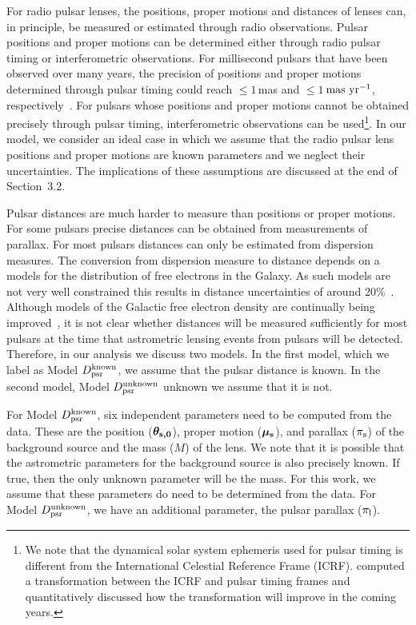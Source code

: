 \documentclass[iop,apj]{emulateapj}
\begin{document}
For radio pulsar lenses, the positions, proper motions and distances of lenses can, in 
principle, be measured or estimated through radio observations. Pulsar positions and proper 
motions can be determined either through radio pulsar timing or interferometric observations. 
%
For millisecond pulsars that have been observed over many years, the precision of positions 
and proper motions determined through pulsar timing could reach $\leq 1$\,mas and 
$\leq 1$\,$\rm{mas\ yr^{-1}}$, respectively~\citep[e.g.,][]{verbiest}.
%
For pulsars whose positions and proper motions cannot be obtained precisely through 
pulsar timing, interferometric observations can be used\footnote{We note that the dynamical 
solar system ephemeris used for pulsar timing is different from the International Celestial 
Reference Frame (ICRF). \citet{Madison13} computed a transformation between the ICRF 
and pulsar timing frames and quantitatively discussed how the transformation will improve in 
the coming years.}. In our model, we consider an ideal case in which we assume that the 
radio pulsar lens positions and proper motions are known parameters and we neglect their 
uncertainties. The implications of these assumptions are discussed at the end of Section~3.2.
%

Pulsar distances are much harder to measure than positions or proper motions.
For some pulsars precise distances can be obtained from measurements of parallax.
For most pulsars distances can only be estimated from dispersion measures. The conversion 
from dispersion measure to distance depends on a models for the distribution of 
free electrons in the Galaxy.
%
As such models are not very well constrained this results in distance uncertainties of
around 20\%~\citep{Taylor}.
%
Although models of the Galactic free electron density are continually being improved~\citep[e.g.,][]{cordes},
it is not clear whether distances will be measured sufficiently for most pulsars at 
the time that astrometric lensing events from pulsars will be detected.
Therefore, in our analysis we discuss two models. In the first model, which we 
label as Model $D_{\rm{psr}}^{\rm{known}}$, we assume that the pulsar distance is known. 
In the second model, Model $D_{\rm{psr}}^{\rm{unknown}}$ unknown we assume 
that it is not.
%

For Model $D_{\rm{psr}}^{\rm{known}}$, six independent parameters need to be computed from the data. 
These are the position ($\bm{\theta_{\rm{s,0}}}$), proper motion ($\bm{\mu_{\rm{s}}}$), 
and parallax ($\pi_{\rm{s}}$) of the background source and the mass ($M$) of 
the lens. We note that it is possible that the astrometric parameters for the background 
source is also precisely known. If true, then the only unknown parameter will be the mass.  
For this work, we assume that these parameters do need to be determined from the data. For  
Model $D_{\rm{psr}}^{\rm{unknown}}$, we have an additional parameter, the pulsar parallax ($\pi_{\rm{l}}$).  
\end{document}
